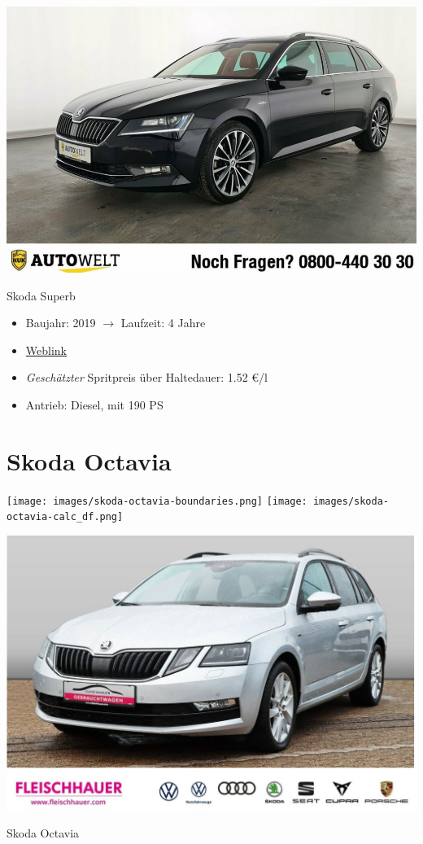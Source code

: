 \documentclass[landscape, DIV=99, 14pt]{scrartcl}
\begin{document}
\pagebreak
\null
\vspace{2cm}
\begin{center}
\includegraphics[width=0.9\columnwidth]{cars/skoda-superb.png}

Skoda Superb
\end{center}

\begin{itemize}
    \item Baujahr: 2019 $\rightarrow$ Laufzeit: 4 Jahre
    \item \href{https://suchen.mobile.de/fahrzeuge/details.html?id=336967099}{Weblink}
    \item \emph{Gesch\"atzter} Spritpreis \"uber Haltedauer: 1.52 \euro{}/l
    \item Antrieb: Diesel, mit 190 PS
\end{itemize}

\pagebreak


\twocolumn

\section*{Skoda Octavia}
\begin{center}
\texttt{[image: images/skoda-octavia-boundaries.png]}
\null
\vspace{0.5cm}
\texttt{[image: images/skoda-octavia-calc\_df.png]}
\end{center}

\pagebreak
\null
\vspace{2cm}
\begin{center}
\includegraphics[width=0.9\columnwidth]{cars/skoda-octavia.png}

Skoda Octavia
\end{center}
\end{document}
